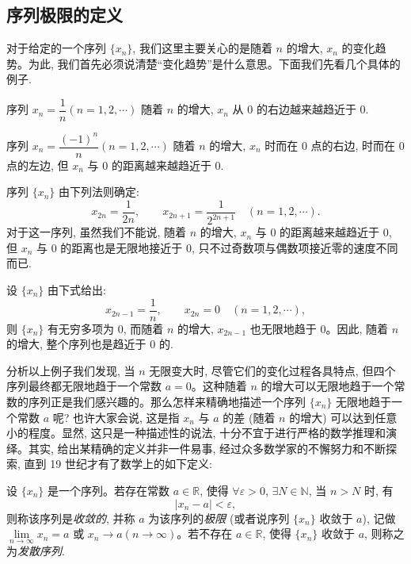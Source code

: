 \subsection{序列极限的定义}
\label{subsec:ma-2-1-2}

对于给定的一个序列 $\{x_n\}$, 我们这里主要关心的是随着 $n$ 的增大, $x_n$ 的变化趋势。为此, 我们首先必须说清楚``变化趋势''是什么意思。下面我们先看几个具体的例子.

\begin{example}\label{example:ma-2-1-1}
序列 $x_n=\dfrac1n(n=1,2,\cdots)$ 随着 $n$ 的增大, $x_n$ 从 $0$ 的右边越来越趋近于 $0$.
\end{example}


\begin{example}\label{example:ma-2-1-2}
序列 $x_n=\dfrac{(-1)^n}{n}(n=1,2,\cdots)$ 随着 $n$ 的增大, $x_n$ 时而在 $0$ 点的右边, 时而在 $0$ 点的左边, 但 $x_n$ 与 $0$ 的距离越来越趋近于 $0$.
\end{example}


\begin{example}\label{example:ma-2-1-3}
序列 $\{x_n\}$ 由下列法则确定:
\[
  x_{2n}=\frac1{2n},\qquad
  x_{2n+1}=\frac1{2^{2n+1}}
  \quad(n=1,2,\cdots).
\]
对于这一序列, 虽然我们不能说, 随着 $n$ 的增大, $x_n$ 与 $0$ 的距离越来越趋近于 $0$, 但 $x_n$ 与 $0$ 的距离也是无限地接近于 $0$, 只不过奇数项与偶数项接近零的速度不同而已.
\end{example}


\begin{example}\label{example:ma-2-1-4}
设 $\{x_n\}$ 由下式给出:
\[
  x_{2n-1}=\frac1n,\qquad
  x_{2n}=0
  \quad(n=1,2,\cdots),
\]
则 $\{x_n\}$ 有无穷多项为 $0$, 而随着 $n$ 的增大, $x_{2n-1}$ 也无限地趋于 $0$。因此, 随着 $n$ 的增大, 整个序列也是趋近于 $0$ 的.
\end{example}

分析以上例子我们发现, 当 $n$ 无限变大时, 尽管它们的变化过程各具特点, 但四个序列最终都无限地趋于一个常数 $a=0$。这种随着 $n$ 的增大可以无限地趋于一个常数的序列正是我们感兴趣的。那么怎样来精确地描述一个序列 $\{x_n\}$ 无限地趋于一个常数 $a$ 呢? 也许大家会说, 这是指 $x_n$ 与 $a$ 的差 (随着 $n$ 的增大) 可以达到任意小的程度。显然, 这只是一种描述性的说法, 十分不宜于进行严格的数学推理和演绎。其实, 给出某精确的定义并非一件易事, 经过众多数学家的不懈努力和不断探索, 直到 19 世纪才有了数学上的如下定义:

\begin{definition}\label{definition:ma-2-1-1}
设 $\{x_n\}$ 是一个序列。若存在常数 $a\in\mathbb{R}$, 使得 $\forall\varepsilon>0$, $\exists N\in\mathbb{N}$, 当 $n>N$ 时, 有
\[
  |x_n-a|<\varepsilon,
\]
则称该序列是\emph{收敛的}, 并称 $a$ 为该序列的\emph{极限} (或者说序列 $\{x_n\}$ 收敛于 $a$), 记做 $\lim\limits_{n\to\infty}x_n=a$ 或 $x_n\to a(n\to\infty)$。若不存在 $a\in\mathbb{R}$, 使得 $\{x_n\}$ 收敛于 $a$, 则称之为\emph{发散序列}.
\end{definition}

